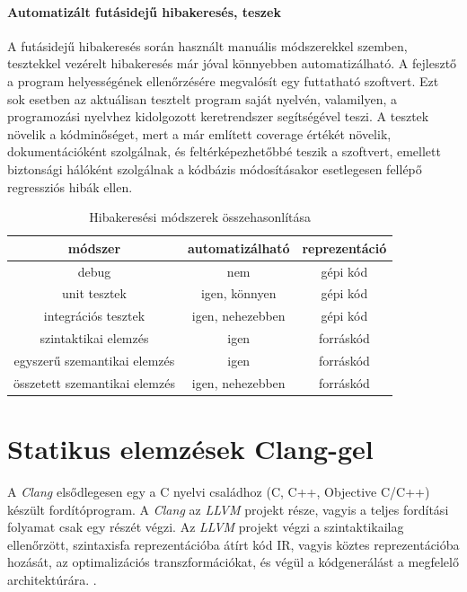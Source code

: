 \documentclass[a4paper,12pt]{report}
\begin{document}
\subsubsection{Automatizált futásidejű hibakeresés, teszek}
A futásidejű hibakeresés során használt manuális módszerekkel szemben, tesztekkel vezérelt hibakeresés már jóval könnyebben automatizálható. A fejlesztő a program helyességének ellenőrzésére megvalósít egy futtatható szoftvert. Ezt sok esetben az aktuálisan tesztelt program saját nyelvén, valamilyen, a programozási nyelvhez kidolgozott keretrendszer segítségével teszi. A tesztek növelik a kódminőséget, mert a már említett coverage értékét növelik, dokumentációként szolgálnak, és feltérképezhetőbbé teszik a szoftvert, emellett biztonsági hálóként szolgálnak a kódbázis módosításakor esetlegesen fellépő regressziós hibák ellen.


\begin{table}[h!]
\centering
\begin{tabular}{||c c c||} 
 \hline
 módszer & automatizálható & reprezentáció \\
 \hline\hline
 debug & nem & gépi kód\footnotemark[1] \\ 
 unit tesztek & igen, könnyen & gépi kód \\
 integrációs tesztek & igen, nehezebben & gépi kód \\
 szintaktikai elemzés & igen & forráskód \\ 
 egyszerű szemantikai elemzés & igen & forráskód \\
 összetett szemantikai elemzés & igen, nehezebben & forráskód \\
 \hline
\end{tabular}
\caption{Hibakeresési módszerek összehasonlítása}
\label{table:errorfindmethods}
\end{table}


\chapter{Statikus elemzések Clang-gel}
A \emph{Clang} elsődlegesen egy a C nyelvi családhoz (C, C++, Objective C/C++) készült fordítóprogram. A \emph{Clang} az \emph{LLVM} projekt része, vagyis a teljes fordítási folyamat csak egy részét végzi. Az \emph{LLVM} projekt \cite{llvmhomepage} végzi a szintaktikailag ellenőrzött, szintaxisfa reprezentációba átírt kód IR, vagyis köztes reprezentációba hozását, az optimalizációs transzformációkat, és végül a kódgenerálást a megfelelő architektúrára. \cite{llvmhomepage}.
\end{document}
